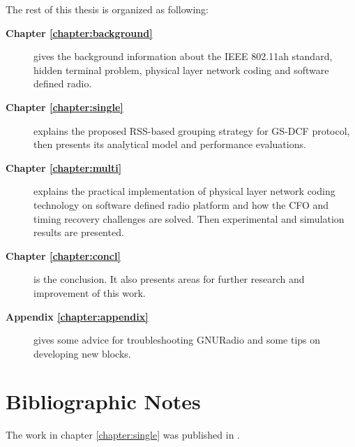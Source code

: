 The rest of this thesis is organized as following:
\begin{description}
\item[\textbf{Chapter \ref{chapter:background}}] gives the background information about the IEEE 802.11ah standard, hidden terminal problem, physical layer network coding and software defined radio.
\item[\textbf{Chapter \ref{chapter:single}}] explains the proposed RSS-based grouping strategy for GS-DCF protocol, then presents its analytical model and performance evaluations.
\item[\textbf{Chapter \ref{chapter:multi}}] explains the practical implementation of physical layer network coding technology on software defined radio platform and how the CFO and timing recovery challenges are solved. Then experimental and simulation results are presented.
\item[\textbf{Chapter \ref{chapter:concl}}] is the conclusion. It also presents areas for further research and improvement of this work.
\item[\textbf{Appendix \ref{chapter:appendix}}] gives some advice for troubleshooting GNURadio and some tips on developing new blocks. 
\end{description}


\section{Bibliographic Notes}
The work in chapter \ref{chapter:single} was published in \cite{ghasemiahmadi2017rss}. 